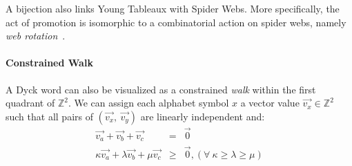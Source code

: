 \documentclass{llncs}
\begin{document}
A bijection also links Young Tableaux with Spider Webs. More specifically, the act of promotion is isomorphic to a combinatorial action on spider webs, namely \textit{web rotation}~\cite{petersen}.

\paragraph{\textbf{Constrained Walk}}
A Dyck word can also be visualized as a constrained \textit{walk} within the first quadrant of $\mathbb{Z}^2$. We can assign each alphabet symbol $x$ a vector value $\vec{v_x} \in \mathbb{Z}^2$ such that all pairs of $(\vec{v_x},\ \vec{v_y})$ are linearly independent and:
\begin{eqnarray}
\vec{v_a} + \vec{v_b} + \vec{v_c} &=& \vec{0} \\
\kappa\vec{v_a} + \lambda\vec{v_b} + \mu\vec{v_c} &\geq & \vec{0},  (\forall \ \kappa \geq \lambda \geq \mu)
\end{eqnarray}
\end{document}
